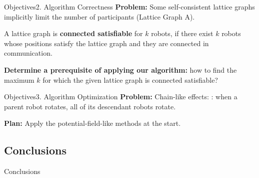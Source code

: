 \documentclass[10pt]{beamer}
\begin{document}
\begin{frame}{Objectives}{2. Algorithm Correctness}
  \textbf{Problem:} Some self-consistent lattice graphs implicitly limit the
  number of participants (Lattice Graph A).
  
  \begin{definition}
    \small{A lattice graph is \textbf{connected satisfiable} for $k$ robots, if
      there exist $k$ robots whose positions satisfy the lattice graph and they
      are connected in communication.}
  \end{definition}
   
  \textbf{Determine a prerequisite of applying our algorithm:}
  how to find the maximum $k$ for which the given lattice graph is
  connected satisfiable?
\end{frame}

\begin{frame}{Objectives}{3. Algorithm Optimization}
  \textbf{Problem:} Chain-like effects: : when a parent robot rotates, all
  of its descendant robots rotate.
  
  \textbf{Plan:} Apply the potential-field-like methods at the start.
\end{frame}

\subsection{Conclusions}
\begin{frame}{Conclusions}
 

\end{frame}
\end{document}
